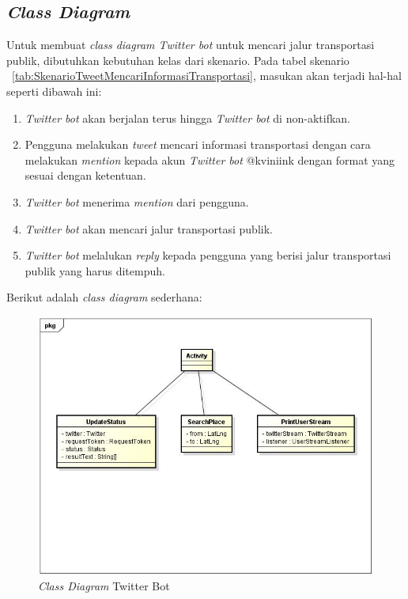 \subsection{\textit{Class Diagram}}
Untuk membuat \textit{class diagram Twitter bot} untuk mencari jalur transportasi publik, dibutuhkan kebutuhan kelas dari skenario. Pada tabel skenario ~\ref{tab:SkenarioTweetMencariInformasiTransportasi}, masukan akan terjadi hal-hal seperti dibawah ini:
\begin{enumerate}
	\item \textit{Twitter bot} akan berjalan terus hingga \textit{Twitter bot} di non-aktifkan.
	\item Pengguna melakukan \textit{tweet} mencari informasi transportasi dengan cara melakukan \textit{mention} kepada akun \textit{Twitter bot} @kviniink dengan format yang sesuai dengan ketentuan.
	\item \textit{Twitter bot} menerima \textit{mention} dari pengguna.
	\item \textit{Twitter bot} akan mencari jalur transportasi publik.
	\item \textit{Twitter bot} melalukan \textit{reply} kepada pengguna yang berisi jalur transportasi publik yang harus ditempuh. 
\end{enumerate}

Berikut adalah \textit{class diagram} sederhana:
\begin{figure}[htbp]
	\centering
		\includegraphics{Gambar/diagramClass.jpg}
	\caption{\textit{Class Diagram} Twitter Bot}
	\label{fig:classdiagram}
\end{figure}